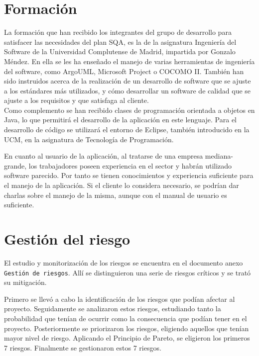 \documentclass[spanish,a4paper,11pt, twoside]{report}	%
\begin{document}
\chapter{ \hspace{0.25cm}Formación}
	La formación que han recibido los integrantes del grupo de desarrollo para satisfacer las necesidades del plan SQA, es la de la asignatura Ingeniería del Software de la Universidad Complutense de Madrid, impartida por Gonzalo Méndez. En ella se les ha enseñado el manejo
	de varias herramientas de ingeniería del software, como ArgoUML, Microsoft Project o COCOMO II. También han sido instruidos acerca de la realización de un desarrollo de software que se ajuste a los estándares más utilizados, y cómo
	 desarrollar un software de calidad que se ajuste a los requisitos y que satisfaga al cliente.\\
	
	Como complemento se han recibido clases de programación orientada a objetos en Java, lo que permitirá el desarrollo de la aplicación en este lenguaje. Para el desarrollo de código se utilizará el entorno de Eclipse, también introducido en la UCM, en la asignatura de Tecnología de Programación.

	En cuanto al usuario de la aplicación, al tratarse de una empresa mediana- grande, los trabajadores poseen experiencia en el sector y habrán utilizado software parecido. Por tanto se tienen conocimientos y experiencia suficiente para el manejo de la aplicación. Si el cliente lo considera necesario, se podrían dar charlas sobre el manejo de la misma, aunque con el manual de usuario es suficiente.

\newpage
\mbox{}
\thispagestyle{empty}						%
\newpage

\chapter{ \hspace{0.25cm}Gestión del riesgo}
	El estudio y monitorización de los riesgos se encuentra en el documento anexo \texttt{Gestión de riesgos}. Allí se distinguieron una serie de riesgos críticos y se trató su mitigación. 

	Primero se llevó a cabo la identificación de los riesgos que podían afectar al proyecto. Seguidamente se analizaron estos riesgos, estudiando tanto la probabilidad que tenían de ocurrir como la consecuencia que podían tener en el proyecto. Posteriormente se priorizaron los riesgos, eligiendo aquellos que tenían mayor nivel de riesgo. Aplicando el Principio de Pareto, se eligieron los primeros 7 riesgos. Finalmente se gestionaron estos 7 riesgos.
\end{document}
